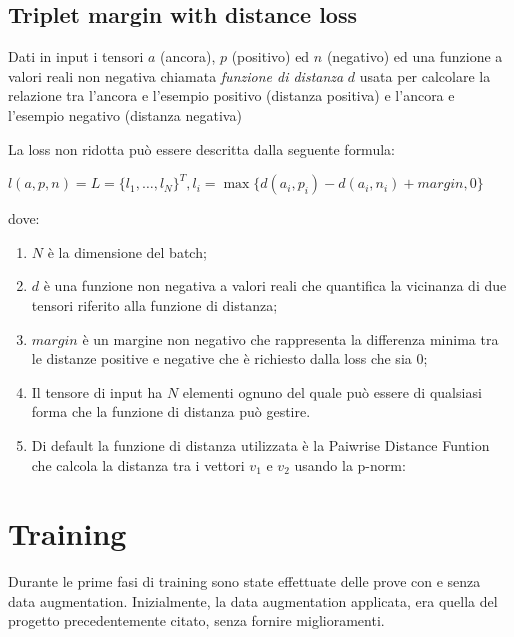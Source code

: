 \documentclass[11pt]{article}
\begin{document}
\subsection{Triplet margin with distance loss}
Dati in input i tensori $a$ (ancora), $p$ (positivo) ed $n$ (negativo) ed una funzione a valori
reali non negativa chiamata \textit{funzione di distanza} $d$ usata per calcolare la relazione tra
l'ancora e l'esempio positivo (distanza positiva) e l'ancora e l'esempio negativo (distanza negativa)

La loss non ridotta può essere descritta dalla seguente formula:

\begin{center}
    $l(a,p,n) = L = { \{ l_1, \ldots, l_N \}}^T, l_i = \max{\{ d(a_i, p_i) - d(a_i, n_i) + margin, 0 \}} $
\end{center}

dove:

\begin{enumerate}
    \item $N$ è la dimensione del batch;
    \item {$d$ è una funzione non negativa a valori reali che quantifica la vicinanza di due tensori riferito
    alla funzione di distanza;}
    \item {$margin$ 
        è un margine non negativo che rappresenta la differenza minima
        tra le distanze positive e negative che è richiesto dalla loss che sia 0;
    }
    \item Il tensore di input ha $N$ elementi ognuno del quale può essere di qualsiasi forma che la funzione di distanza può gestire.

    \item {
        Di default la funzione di distanza utilizzata è la Paiwrise Distance Funtion
        che calcola la distanza tra i vettori $v_1$ e $v_2$ usando la p-norm:
    }

\end{enumerate}

\section{Training}

Durante le prime fasi di training sono state effettuate delle prove con e senza data augmentation. Inizialmente, la data augmentation applicata,
era quella del progetto precedentemente citato, senza fornire miglioramenti.
\end{document}
